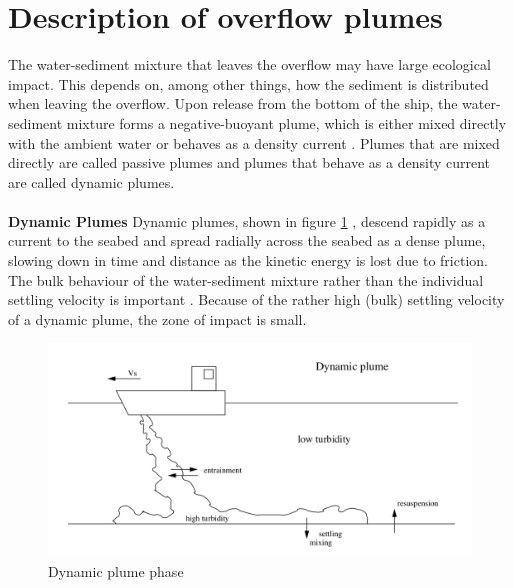 
\section{Description of overflow plumes}
\label{sec:plume}

The water-sediment mixture that leaves the overflow may have large ecological impact. This depends on, among other things, how the sediment is distributed when leaving the overflow. Upon release from the bottom of the ship, the water-sediment mixture forms a negative-buoyant plume, which is either mixed directly with the ambient water or behaves as a density current \citep{Winterwerp}. Plumes that are mixed directly are called passive plumes and plumes that behave as a density current are called dynamic plumes. \\\\

\noindent \textbf{Dynamic Plumes} \newline
Dynamic plumes, shown in figure \ref{fig:dynamic_plume} \citep{Dankers}, descend rapidly as a current to the seabed and spread radially across the seabed as a dense plume, slowing down in time and distance as the kinetic energy is lost due to friction. The bulk behaviour of the water-sediment mixture rather than the individual settling velocity is important \citep{Winterwerp}. Because of the rather high (bulk) settling velocity of a dynamic plume, the zone of impact is small.
\begin{figure}[ht!]
    \centering
    \includegraphics[width=.85\linewidth]{Images/Plume_dynamic.png}
    \caption{Dynamic plume phase }
    \label{fig:dynamic_plume}
\end{figure}

